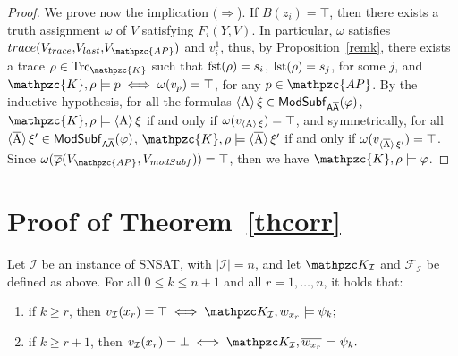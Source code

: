 \begin{proof}
We prove now the implication $(\Rightarrow$). If $B(z_i)=\top$, then there exists a truth assignment $\omega$ of $V$ satisfying $F_i(Y,\! V)$. In particular, $\omega$ satisfies $trace(V_{trace},\! V_{last},\! V_{\mathpzc{AP}})$ and $v_i^1$, thus, by Proposition~\ref{remk}, there exists a trace $\rho\in\Trk_\mathpzc{K}$ such that $\operatorname{fst}(\rho)=s_i$, $\operatorname{lst}(\rho)=s_j$, for some $j$, and $\mathpzc{K},\rho\models p\iff \omega(v_p)=\top$, for any $p\in\mathpzc{AP}$. 
By the inductive hypothesis, for all the formulas $\operatorname{\langle A\rangle}\xi\in\mathsf{ModSubf}_{\mathsf{A\overline{A}}}(\varphi)$, $\mathpzc{K},\rho\models\hsA\xi$ if and only if $\omega(v_{\operatorname{\langle A\rangle}\xi})=\top$, and symmetrically, for all $\operatorname{\langle \overline{A}\rangle}\xi'\in\mathsf{ModSubf}_{\mathsf{A\overline{A}}}(\varphi)$, $\mathpzc{K},\rho\models\hsAt\xi'$ if and only if $\omega(v_{\operatorname{\langle \overline{A}\rangle}\xi'})=\top$. 
%
Since $\omega(\overline{\varphi}(V_{\mathpzc{AP}},V_{modSubf}))=\top$, then we have $\mathpzc{K},\rho\models \varphi$.
\end{proof}


\section{Proof of Theorem~\ref{thcorr}}\label{proof:thcorr}

\begin{theorem*}[\ref{thcorr}]
Let $\mathcal{I}$ be an instance of SNSAT, with $|\mathcal{I}|=n$, and let $\Ku_\mathcal{I}$ and $\mathcal{F}_\mathcal{I}$
be defined as above. For all $0\leq k\leq n+1$ and all $r=1,\ldots , n$, it holds that:
	\begin{enumerate}
		\item if $k\geq r$, then $v_\mathcal{I}(x_r)=\top \iff \Ku_\mathcal{I},w_{x_r}\models \psi_k;$
		\item if $k\geq r+1$, then $v_\mathcal{I}(x_r)=\bot \iff \Ku_\mathcal{I},\overline{w_{x_r}}\models \psi_k.$
	\end{enumerate}
\end{theorem*}

